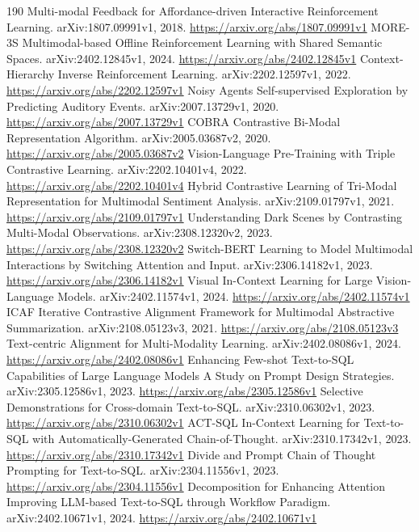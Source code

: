 \documentclass[11pt]{article}
\begin{document}
\begin{thebibliography}{190}
 Multi-modal Feedback for Affordance-driven Interactive Reinforcement Learning. arXiv:1807.09991v1, 2018. \url{https://arxiv.org/abs/1807.09991v1}
 MORE-3S Multimodal-based Offline Reinforcement Learning with Shared Semantic Spaces. arXiv:2402.12845v1, 2024. \url{https://arxiv.org/abs/2402.12845v1}
 Context-Hierarchy Inverse Reinforcement Learning. arXiv:2202.12597v1, 2022. \url{https://arxiv.org/abs/2202.12597v1}
 Noisy Agents Self-supervised Exploration by Predicting Auditory Events. arXiv:2007.13729v1, 2020. \url{https://arxiv.org/abs/2007.13729v1}
 COBRA Contrastive Bi-Modal Representation Algorithm. arXiv:2005.03687v2, 2020. \url{https://arxiv.org/abs/2005.03687v2}
 Vision-Language Pre-Training with Triple Contrastive Learning. arXiv:2202.10401v4, 2022. \url{https://arxiv.org/abs/2202.10401v4}
 Hybrid Contrastive Learning of Tri-Modal Representation for Multimodal Sentiment Analysis. arXiv:2109.01797v1, 2021. \url{https://arxiv.org/abs/2109.01797v1}
 Understanding Dark Scenes by Contrasting Multi-Modal Observations. arXiv:2308.12320v2, 2023. \url{https://arxiv.org/abs/2308.12320v2}
 Switch-BERT Learning to Model Multimodal Interactions by Switching Attention and Input. arXiv:2306.14182v1, 2023. \url{https://arxiv.org/abs/2306.14182v1}
 Visual In-Context Learning for Large Vision-Language Models. arXiv:2402.11574v1, 2024. \url{https://arxiv.org/abs/2402.11574v1}
 ICAF Iterative Contrastive Alignment Framework for Multimodal Abstractive Summarization. arXiv:2108.05123v3, 2021. \url{https://arxiv.org/abs/2108.05123v3}
 Text-centric Alignment for Multi-Modality Learning. arXiv:2402.08086v1, 2024. \url{https://arxiv.org/abs/2402.08086v1}
 Enhancing Few-shot Text-to-SQL Capabilities of Large Language Models A Study on Prompt Design Strategies. arXiv:2305.12586v1, 2023. \url{https://arxiv.org/abs/2305.12586v1}
 Selective Demonstrations for Cross-domain Text-to-SQL. arXiv:2310.06302v1, 2023. \url{https://arxiv.org/abs/2310.06302v1}
 ACT-SQL In-Context Learning for Text-to-SQL with Automatically-Generated Chain-of-Thought. arXiv:2310.17342v1, 2023. \url{https://arxiv.org/abs/2310.17342v1}
 Divide and Prompt Chain of Thought Prompting for Text-to-SQL. arXiv:2304.11556v1, 2023. \url{https://arxiv.org/abs/2304.11556v1}
 Decomposition for Enhancing Attention Improving LLM-based Text-to-SQL through Workflow Paradigm. arXiv:2402.10671v1, 2024. \url{https://arxiv.org/abs/2402.10671v1}

\end{thebibliography}
\end{document}
